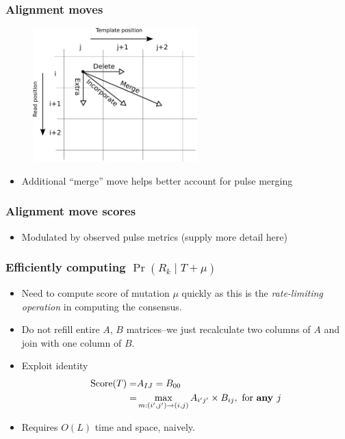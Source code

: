 \documentclass[serif,11pt]{beamer}
\begin{document}
\begin{frame}
\frametitle{Alignment moves}
\label{sec-2-6}

   \begin{figure}
   \centering
   \includegraphics[width=2.5in]{img/moves}
   \end{figure}

\begin{itemize}
\item Additional ``merge'' move helps better account for pulse merging
\end{itemize}
\end{frame}
\begin{frame}
\frametitle{Alignment move scores}
\label{sec-2-7}

\begin{itemize}
\item Modulated by observed pulse metrics (supply more detail here)
\end{itemize}
\end{frame}
\begin{frame}
\frametitle{Efficiently computing $\Pr(R_k \mid T + \mu)$}
\label{sec-2-8}

\begin{itemize}
\item Need to compute score of mutation $\mu$ quickly as this is the
     \emph{rate-limiting operation} in computing the consensus.
\item Do not refill entire $A$, $B$ matrices--we just recalculate two
     columns of $A$ and join with one column of $B$.
\item Exploit identity
     \begin{align*}
     \mathrm{Score}(T) =& A_{IJ} = B_{00} \\
                       =& \max_{m: (i',j') \to (i, j)} A_{i'j'} \times B_{ij},
                       \text{ for \bf{any} $j$}
     \end{align*}
\item Requires $O(L)$ time and space, naively.
\end{itemize}
\end{frame}
\end{document}
